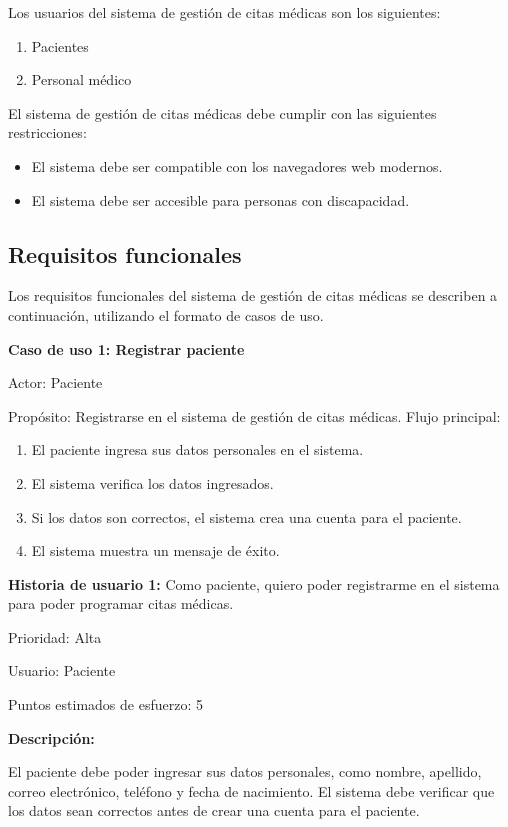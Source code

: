 \documentclass{article}
\theoremstyle{mytheoremstyle}
\theoremstyle{mytheoremstyle}
\theoremstyle{myproblemstyle}
\begin{document}
Los usuarios del sistema de gestión de citas médicas son los siguientes:
\begin{enumerate}
\item Pacientes
\item Personal médico
\end{enumerate}
El sistema de gestión de citas médicas debe cumplir con las siguientes restricciones:
\begin{itemize}
\item El sistema debe ser compatible con los navegadores web modernos.

\item El sistema debe ser accesible para personas con discapacidad.

\end{itemize}

\subsection{Requisitos funcionales}

Los requisitos funcionales del sistema de gestión de citas médicas se describen a continuación, utilizando el formato de casos de uso.

 \textbf{Caso de uso 1: Registrar paciente} 

Actor: Paciente

Propósito: Registrarse en el sistema de gestión de citas médicas.
\newpage
Flujo principal:
\begin{enumerate}
\item El paciente ingresa sus datos personales en el sistema.
\item El sistema verifica los datos ingresados.
\item Si los datos son correctos, el sistema crea una cuenta para el paciente.
\item El sistema muestra un mensaje de éxito.

\end{enumerate}

\textbf{Historia de usuario 1: } 
Como paciente, quiero poder registrarme en el sistema para poder programar citas médicas.

Prioridad: Alta

Usuario: Paciente

Puntos estimados de esfuerzo: 5

\textbf{Descripción:} 

El paciente debe poder ingresar sus datos personales, como nombre, apellido, correo electrónico, teléfono y fecha de nacimiento. El sistema debe verificar que los datos sean correctos antes de crear una cuenta para el paciente.
\end{document}
